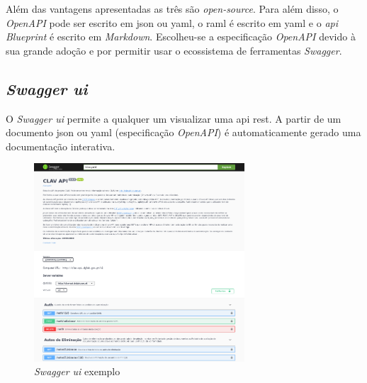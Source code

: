 Além das vantagens apresentadas as três são \textit{open-source}. Para além disso, o \textit{OpenAPI} pode ser escrito em \acrshort{json} ou \acrshort{yaml}, o \acrshort{raml} é escrito em \acrshort{yaml} e o \textit{\acrshort{api} Blueprint} é escrito em \textit{Markdown}. Escolheu-se a especificação \textit{OpenAPI} devido à sua grande adoção e por permitir usar o ecossistema de ferramentas \textit{Swagger}.

\subsection{\textit{Swagger \acrshort{ui}}}

O \textit{Swagger \acrshort{ui}} permite a qualquer um visualizar uma \acrshort{api} \acrshort{rest}. A partir de um documento \acrshort{json} ou \acrshort{yaml} (especificação \textit{OpenAPI}) é automaticamente gerado uma documentação interativa.

\begin{figure}[H]
    \begin{center}
        \includegraphics[width=0.7\textwidth]{img/swaggerUI.png}
    \end{center}
    \caption{\textit{Swagger \acrshort{ui}} exemplo}
\end{figure}

